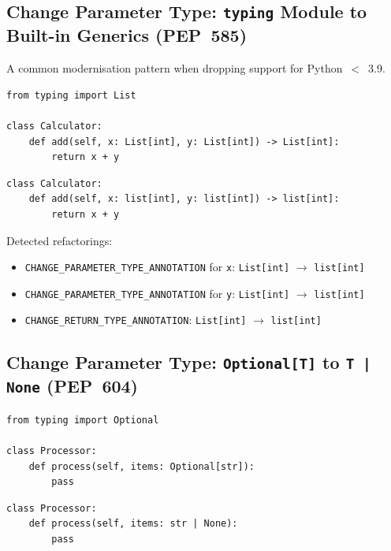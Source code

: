 \documentclass[11pt,a4paper]{article}
\newcommand{\code}[1]{\texttt{#1}}
\begin{document}
\subsection{Change Parameter Type: \texttt{typing} Module to Built-in Generics (PEP~585)}

A common modernisation pattern when dropping support for Python~$<$~3.9.

\begin{lstlisting}[caption={Before: \texttt{typing.List} generics.}]
from typing import List

class Calculator:
    def add(self, x: List[int], y: List[int]) -> List[int]:
        return x + y
\end{lstlisting}

\begin{lstlisting}[caption={After: built-in \texttt{list} generics (PEP 585).}]
class Calculator:
    def add(self, x: list[int], y: list[int]) -> list[int]:
        return x + y
\end{lstlisting}

Detected refactorings:
\begin{itemize}[leftmargin=*]
  \item \code{CHANGE\_PARAMETER\_TYPE\_ANNOTATION} for \code{x}: \code{List[int]} $\to$ \code{list[int]}
  \item \code{CHANGE\_PARAMETER\_TYPE\_ANNOTATION} for \code{y}: \code{List[int]} $\to$ \code{list[int]}
  \item \code{CHANGE\_RETURN\_TYPE\_ANNOTATION}: \code{List[int]} $\to$ \code{list[int]}
\end{itemize}

\subsection{Change Parameter Type: \texttt{Optional[T]} to \texttt{T | None} (PEP~604)}

\begin{lstlisting}[caption={Before: \texttt{Optional} from \texttt{typing}.}]
from typing import Optional

class Processor:
    def process(self, items: Optional[str]):
        pass
\end{lstlisting}

\begin{lstlisting}[caption={After: union syntax (PEP 604).}]
class Processor:
    def process(self, items: str | None):
        pass
\end{lstlisting}
\end{document}
